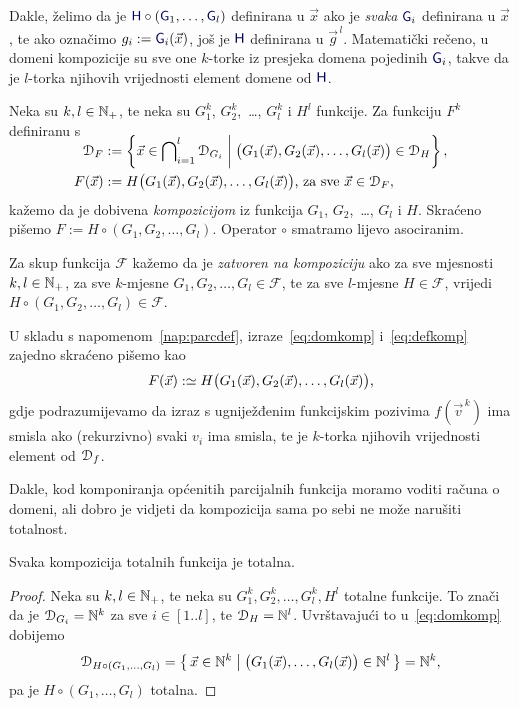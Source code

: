 Dakle, želimo da je $\f H\circ(\f G_1,\dotsc,\f G_l)$ definirana u $\vec x$ ako je \emph{svaka} $\f G_i$ definirana u $\vec x$, te ako označimo $g_i:=\f G_i(\vec x)$, još je $\f H$ definirana u $\vec g^{\,l}$. Matematički rečeno, u domeni kompozicije su sve one $k$-torke iz presjeka domena pojedinih $\f G_i$, takve da je $l$-torka njihovih vrijednosti element domene od $\f H$.
\begin{definicija}
Neka su $k,l\in{\mathbb N}_+$, te neka su $G_1^k$, $G_2^k$,~\ldots, $G_l^k$ i $H^l$ funkcije. Za funkciju $F^k$ definiranu s
\begin{align}
\SwapAboveDisplaySkip
\label{eq:domkomp}
    \dom{F}&:=\left\{\vec x\in\bigcap\nolimits_{i=1}^l\dom{G_i}\;\middle|\;\bigl(G_1(\vec x),G_2(\vec x),\dotsc,G_l(\vec x)\bigr)\in\dom{H}\right\},\\
\label{eq:defkomp}
    F(\vec x)&:=H\bigl(G_1(\vec x),G_2(\vec x),\dotsc,G_l(\vec x)\bigr)\text{, za sve $\vec x\in\dom F$},
\end{align}
kažemo da je dobivena \emph{kompozicijom} iz funkcija $G_1$, $G_2$,~\ldots, $G_l$ i $H$. Skraćeno pišemo $F:=H\circ(G_1,G_2,\dotsc,G_l)$. Operator $\circ$ smatramo lijevo asociranim.

Za skup funkcija $\mathcal F$ kažemo da je \emph{zatvoren na kompoziciju} ako za sve mjesnosti $k,l\in{\mathbb N}_+$, za sve $k$-mjesne $G_1,G_2,\dotsc,G_l\in\mathcal F$, te za sve $l$-mjesne $H\in\mathcal F$, vrijedi $H\circ(G_1,G_2,\dotsc,G_l)\in\mathcal F$.
\end{definicija}
U skladu s napomenom~\ref{nap:parcdef}, izraze~\eqref{eq:domkomp} i~\eqref{eq:defkomp} zajedno skraćeno pišemo kao
\begin{equation}
    F(\vec x):\simeq H\bigl(G_1(\vec x),G_2(\vec x),\dotsc,G_l(\vec x)\bigr)\text,
\end{equation}
gdje podrazumijevamo da izraz s ugniježđenim funkcijskim pozivima $f(\vec v^{\,k})$ ima smisla ako (rekurzivno) svaki $v_i$ ima smisla, te je $k$-torka njihovih vrijednosti element od $\mathcal D_{f}$.

Dakle, kod komponiranja općenitih parcijalnih funkcija moramo voditi računa o domeni, ali dobro je vidjeti da kompozicija sama po sebi ne može narušiti totalnost.

\begin{propozicija}\label{prop:comptot}
Svaka kompozicija totalnih funkcija je totalna.
\end{propozicija}
\begin{proof}
Neka su $k,l\in{\mathbb N}_+$, te neka su $G_1^k,G_2^k,\dotsc,G_l^k,H^l$ totalne funkcije. To znači da je $\mathcal D_{G_i}={\mathbb N}^k$ za sve $i\in[1..l]$, te $\mathcal D_{H}={\mathbb N}^l$. Uvrštavajući to u~\eqref{eq:domkomp} dobijemo
\begin{equation}
    \mathcal D_{H\circ(G_1,\dots,G_l)}=\left\{\,\vec x\in{\mathbb N}^k\;\middle|\;\bigl(G_1(\vec x),\dotsc,G_l(\vec x)\bigr)\in{\mathbb N}^l\,\right\}={\mathbb N}^k\text,
\end{equation}
pa je $H\circ(G_1,\dotsc,G_l)$ totalna.
\end{proof}

